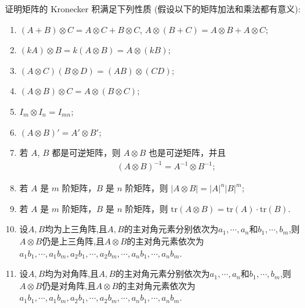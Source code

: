 \documentclass[../../main.tex]{subfiles}%
\begin{document}
\begin{theorem}[矩阵的Kronecker积的基本性质]\label{theorem:矩阵的Kronecker积的基本性质}
证明矩阵的 Kronecker 积满足下列性质 (假设以下的矩阵加法和乘法都有意义):
\begin{enumerate}[(1)]
\item\label{矩阵的Kronecker积的基本性质(1)} $(A + B)\otimes C = A\otimes C + B\otimes C$, $A\otimes (B + C) = A\otimes B + A\otimes C$;
\item\label{矩阵的Kronecker积的基本性质(2)} $(kA)\otimes B = k(A\otimes B) = A\otimes (kB)$;
\item\label{矩阵的Kronecker积的基本性质(3)} $(A\otimes C)(B\otimes D)=(AB)\otimes (CD)$;
\item\label{矩阵的Kronecker积的基本性质(4)} $(A\otimes B)\otimes C = A\otimes (B\otimes C)$;
\item\label{矩阵的Kronecker积的基本性质(5)} $I_m\otimes I_n = I_{mn}$;
\item\label{矩阵的Kronecker积的基本性质(6)} $(A\otimes B)' = A'\otimes B'$;
\item\label{矩阵的Kronecker积的基本性质(7)} 若 $A$, $B$ 都是可逆矩阵，则 $A\otimes B$ 也是可逆矩阵，并且
\begin{align*}
(A\otimes B)^{-1}=A^{-1}\otimes B^{-1};
\end{align*}
\item\label{矩阵的Kronecker积的基本性质(8)} 若 $A$ 是 $m$ 阶矩阵，$B$ 是 $n$ 阶矩阵，则 $|A\otimes B| = |A|^n|B|^m$;
\item\label{矩阵的Kronecker积的基本性质(9)} 若 $A$ 是 $m$ 阶矩阵，$B$ 是 $n$ 阶矩阵，则 $\mathrm{tr}(A\otimes B)=\mathrm{tr}(A)\cdot\mathrm{tr}(B)$.
\item\label{矩阵的Kronecker积的基本性质(10)} 设$A,B$均为上三角阵,且$A,B$的主对角元素分别依次为$a_1,\cdots,a_n$和$b_1,\cdots,b_m$,则$A\otimes B$仍是上三角阵,且$A\otimes B$的主对角元素依次为$a_1b_1,\cdots,a_1b_m,a_2b_1,\cdots,a_2b_m,\cdots,a_nb_1,\cdots,a_nb_m.$
\item\label{矩阵的Kronecker积的基本性质(11)} 设$A,B$均为对角阵,且$A,B$的主对角元素分别依次为$a_1,\cdots,a_n$和$b_1,\cdots,b_m$,则$A\otimes B$仍是对角阵,且$A\otimes B$的主对角元素依次为$a_1b_1,\cdots,a_1b_m,a_2b_1,\cdots,a_2b_m,\cdots,a_nb_1,\cdots,a_nb_m.$
\end{enumerate}
\end{theorem}
\end{document}
